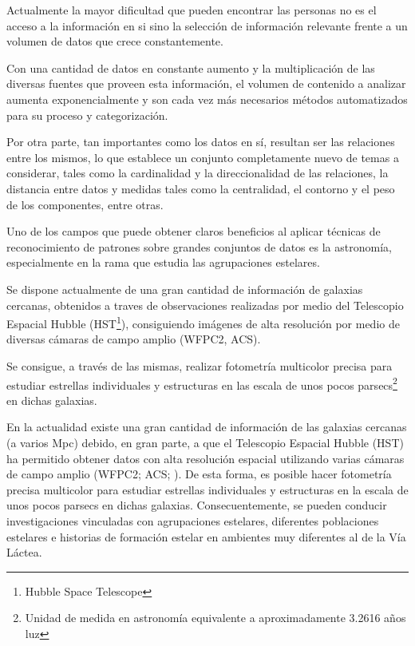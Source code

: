 	\ifdefined\borrador
	\fi
	
	Actualmente la mayor dificultad que pueden encontrar las personas no es el acceso a la información en si sino la selección de información relevante frente a un volumen de datos que crece constantemente.
	
	Con una cantidad de datos en constante aumento y la multiplicación de las diversas fuentes que proveen esta información, el volumen de contenido a analizar aumenta exponencialmente y son cada vez más necesarios métodos automatizados para su proceso y categorización.
	
	Por otra parte, tan importantes como los datos en sí, resultan ser las relaciones entre los mismos, lo que establece un conjunto completamente nuevo de temas a considerar, tales como la cardinalidad y la direccionalidad de las relaciones, la distancia entre datos y medidas tales como la centralidad, el contorno y el peso de los componentes, entre otras. 
	
	Uno de los campos que puede obtener claros beneficios al aplicar técnicas de reconocimiento de patrones sobre grandes conjuntos de datos es la astronomía, especialmente en la rama que estudia las agrupaciones estelares.

	Se dispone actualmente de una gran cantidad de información de galaxias cercanas, obtenidos a traves de observaciones realizadas por medio del Telescopio Espacial Hubble (HST\footnote{Hubble Space Telescope}), consiguiendo imágenes de alta resolución por medio de diversas cámaras de campo amplio (WFPC2, ACS\cite{dalcanton2009acs}).
	
	Se consigue, a través de las mismas, realizar fotometría multicolor precisa para estudiar estrellas individuales y estructuras en las escala de unos pocos parsecs\footnote{Unidad de medida en astronomía equivalente a aproximadamente 3.2616 años luz} en dichas galaxias.
	
	En la actualidad existe una gran cantidad de información de las galaxias cercanas (a varios Mpc) debido, en gran parte, a que el Telescopio Espacial Hubble (HST) ha permitido obtener datos con alta resolución espacial utilizando varias cámaras de campo amplio (WFPC2; ACS; ). De esta forma, es posible hacer fotometría precisa multicolor para estudiar estrellas individuales y estructuras en la escala de unos pocos parsecs en dichas galaxias. Consecuentemente, se pueden conducir investigaciones vinculadas con agrupaciones estelares, diferentes poblaciones estelares e historias de formación estelar en ambientes muy diferentes al de la Vía Láctea.

